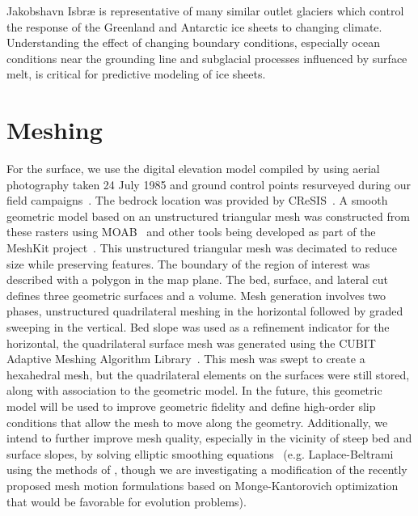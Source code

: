 Jakobshavn Isbr{\ae} is representative of many similar outlet glaciers which control the response of the Greenland and Antarctic ice sheets to changing climate.
Understanding the effect of changing boundary conditions, especially ocean conditions near the grounding line and subglacial processes influenced by surface melt, is critical for predictive modeling of ice sheets.


\section{Meshing}
For the surface, we use the digital elevation model compiled by \citet{motyka2010volume} using aerial photography taken 24 July 1985 and ground control points resurveyed during our field campaigns~.
The bedrock location was provided by CReSIS~.
A smooth geometric model based on an unstructured triangular mesh was constructed from these rasters using MOAB~\citep{moab} and other tools being developed as part of the MeshKit project~\citep{meshkit}.
This unstructured triangular mesh was decimated to reduce size while preserving features.
The boundary of the region of interest was described with a polygon in the map plane.
The bed, surface, and lateral cut defines three geometric surfaces and a volume.
Mesh generation involves two phases, unstructured quadrilateral meshing in the horizontal followed by graded sweeping in the vertical.
Bed slope was used as a refinement indicator for the horizontal, the quadrilateral surface mesh was generated using the CUBIT Adaptive Meshing Algorithm Library~\citep{blacker1994cmg}.
This mesh was swept to create a hexahedral mesh, but the quadrilateral elements on the surfaces were still stored, along with association to the geometric model.
In the future, this geometric model will be used to improve geometric fidelity and define high-order slip conditions that allow the mesh to move along the geometry.
Additionally, we intend to further improve mesh quality, especially in the vicinity of steep bed and surface slopes, by solving elliptic smoothing equations~\citep{liseikin2009grid} (e.g. Laplace-Beltrami using the methods of \citet{hansen2007unstructured,berndt2008efficient}, though we are investigating a modification of the recently proposed mesh motion formulations based on Monge-Kantorovich optimization~\citet{delzanno2008optimal,chacon2011robust} that would be favorable for evolution problems).

